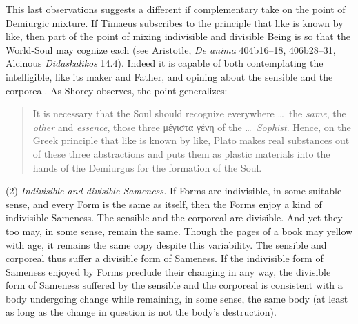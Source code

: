 This last observations suggests a different if complementary take on the point of Demiurgic mixture. If Timaeus subscribes to the principle that like is known by like, then part of the point of mixing indivisible and divisible Being is so that the World-Soul may cognize each (see Aristotle, \emph{De anima} 404b16--18, 406b28--31, Alcinous \emph{Didaskalikos} 14.4). Indeed it is capable of both contemplating the intelligible, like its maker and Father, and opining about the sensible and the corporeal. As Shorey observes, the point generalizes:
\begin{quote}
	It is necessary that the Soul should recognize everywhere \ldots\ the \emph{same}, the \emph{other} and \emph{essence}, those three {\sbl μέγιστα γένη} of the \ldots\ \emph{Sophist}. Hence, on the Greek principle that like is known by like, Plato makes real substances out of these three abstractions and puts them as plastic materials into the hands of the Demiurgus for the formation of the Soul.
\end{quote}

(2) \emph{Indivisible and divisible Sameness.} If Forms are indivisible, in some suitable sense, and every Form is the same as itself, then the Forms enjoy a kind of indivisible Sameness. The sensible and the corporeal are divisible. And yet they too may, in some sense, remain the same. Though the pages of a book may yellow with age, it remains the same copy despite this variability. The sensible and corporeal thus suffer a divisible form of Sameness. If the indivisible form of Sameness enjoyed by Forms preclude their changing in any way, the divisible form of Sameness suffered by the sensible and the corporeal is consistent with a body undergoing change while remaining, in some sense, the same body (at least as long as the change in question is not the body's destruction).

